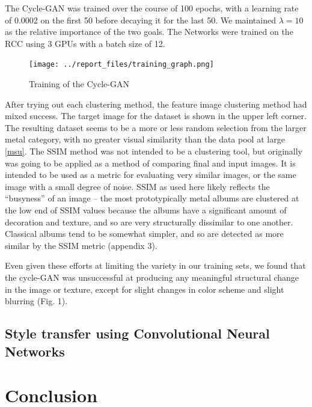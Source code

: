 \documentclass{article}
\begin{document}
The Cycle-GAN was trained over the course of 100 epochs, with a learning rate of 0.0002 on the first 50 before decaying it for the last 50. We maintained $\lambda = 10$ as the relative importance of the two goals. The Networks were trained on the RCC using 3 GPUs with a batch size of 12.

\begin{figure}[h!]
\centering
\texttt{[image: ../report\_files/training\_graph.png]}
\caption{Training of the Cycle-GAN}
\end{figure}

After trying out each clustering method, the feature image clustering method \cite{5696720} had mixed success. The target image for the dataset is shown in the upper left corner. The resulting dataset seems to be a more or less random selection from the larger metal category, with no greater visual similarity than the data pool at large \ref{msu}. The SSIM method was not intended to be a clustering tool, but originally was going to be applied as a method of comparing final and input images. It is intended to be used as a metric for evaluating very similar images, or the same image with a small degree of noise. SSIM as used here likely reflects the “busyness” of an image – the most prototypically metal albums are clustered at the low end of SSIM values because the albums have a significant amount of decoration and texture, and so are very structurally dissimilar to one another. Classical albums tend to be somewhat simpler, and so are detected as more similar by the SSIM metric (appendix 3).

Even given these efforts at limiting the variety in our training sets, we found that the cycle-GAN was unsuccessful at producing any meaningful structural change in the image or texture, except for slight changes in color scheme and slight blurring (Fig. 1).


\subsection{Style transfer using Convolutional Neural Networks}

\section{Conclusion}
\end{document}
